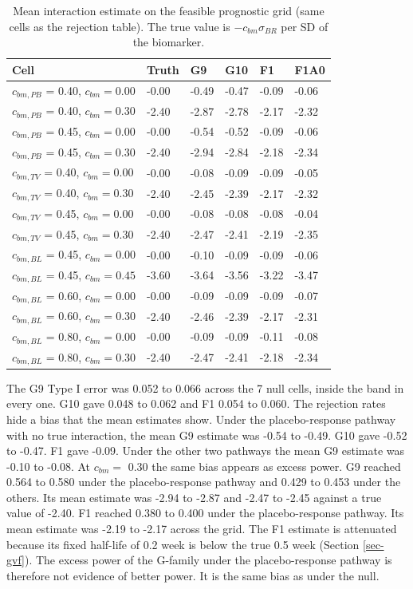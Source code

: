 \documentclass[
  11pt,
]{article}
\begin{document}
\begin{table}
\centering
\caption{\label{tab:tab-grid-est}Mean interaction estimate on the feasible prognostic
      grid (same cells as the rejection table). The true value is
      $-c_{bm}\sigma_{BR}$ per SD of the biomarker.}
\centering
\fontsize{9}{11}\selectfont
\begin{tabular}[t]{llllll}
\toprule
Cell & Truth & G9 & G10 & F1 & F1A0\\
\midrule
$c_{bm,PB}$ = 0.40, $c_{bm} = 0.00$ & -0.00 & -0.49 & -0.47 & -0.09 & -0.06\\
$c_{bm,PB}$ = 0.40, $c_{bm} = 0.30$ & -2.40 & -2.87 & -2.78 & -2.17 & -2.32\\
$c_{bm,PB}$ = 0.45, $c_{bm} = 0.00$ & -0.00 & -0.54 & -0.52 & -0.09 & -0.06\\
$c_{bm,PB}$ = 0.45, $c_{bm} = 0.30$ & -2.40 & -2.94 & -2.84 & -2.18 & -2.34\\
$c_{bm,TV}$ = 0.40, $c_{bm} = 0.00$ & -0.00 & -0.08 & -0.09 & -0.09 & -0.05\\
$c_{bm,TV}$ = 0.40, $c_{bm} = 0.30$ & -2.40 & -2.45 & -2.39 & -2.17 & -2.32\\
$c_{bm,TV}$ = 0.45, $c_{bm} = 0.00$ & -0.00 & -0.08 & -0.08 & -0.08 & -0.04\\
$c_{bm,TV}$ = 0.45, $c_{bm} = 0.30$ & -2.40 & -2.47 & -2.41 & -2.19 & -2.35\\
$c_{bm,BL}$ = 0.45, $c_{bm} = 0.00$ & -0.00 & -0.10 & -0.09 & -0.09 & -0.06\\
$c_{bm,BL}$ = 0.45, $c_{bm} = 0.45$ & -3.60 & -3.64 & -3.56 & -3.22 & -3.47\\
$c_{bm,BL}$ = 0.60, $c_{bm} = 0.00$ & -0.00 & -0.09 & -0.09 & -0.09 & -0.07\\
$c_{bm,BL}$ = 0.60, $c_{bm} = 0.30$ & -2.40 & -2.46 & -2.39 & -2.17 & -2.31\\
$c_{bm,BL}$ = 0.80, $c_{bm} = 0.00$ & -0.00 & -0.09 & -0.09 & -0.11 & -0.08\\
$c_{bm,BL}$ = 0.80, $c_{bm} = 0.30$ & -2.40 & -2.47 & -2.41 & -2.18 & -2.34\\
\bottomrule
\end{tabular}
\end{table}

The G9 Type I error was 0.052 to 0.066 across the
7 null cells, inside the band in every one. G10 gave
0.048 to 0.062 and F1 0.054 to 0.060. The rejection rates
hide a bias that the mean estimates show. Under the placebo-response
pathway with no true interaction, the mean G9 estimate was
-0.54 to -0.49. G10 gave -0.52 to -0.47. F1 gave
-0.09. Under the other two pathways the mean G9
estimate was -0.10 to -0.08. At \(c_{bm} =\) 0.30
the same bias appears as excess power. G9 reached 0.564 to 0.580
under the placebo-response pathway and 0.429 to 0.453 under the
others. Its mean estimate was -2.94 to -2.87 and
-2.47 to -2.45 against a true value of -2.40. F1
reached 0.380 to 0.400 under the placebo-response pathway. Its
mean estimate was -2.19 to -2.17 across the grid. The F1 estimate
is attenuated because its fixed half-life of 0.2 week is below the
true 0.5 week (Section \ref{sec-gvf}). The excess power of the
G-family under the placebo-response pathway is therefore not evidence
of better power. It is the same bias as under the null.
\end{document}
